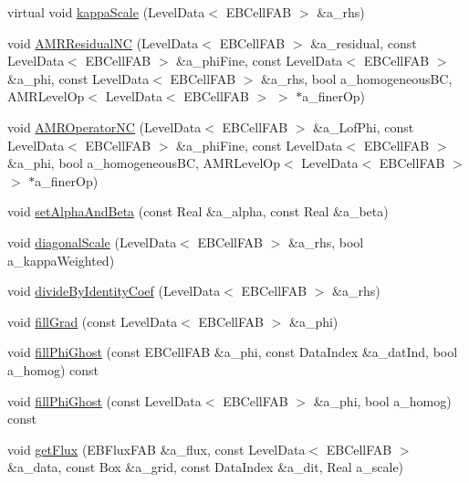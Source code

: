 \begin{DoxyCompactItemize}
virtual void \hyperlink{classnwoebconductivityop_a12a638d8ae31515fadd1510176c2c712}{kappa\+Scale} (Level\+Data$<$ E\+B\+Cell\+F\+AB $>$ \&a\+\_\+rhs)
\item 
void \hyperlink{classnwoebconductivityop_ae8ab6c2d1da51e83415c91d0168a449b}{A\+M\+R\+Residual\+NC} (Level\+Data$<$ E\+B\+Cell\+F\+AB $>$ \&a\+\_\+residual, const Level\+Data$<$ E\+B\+Cell\+F\+AB $>$ \&a\+\_\+phi\+Fine, const Level\+Data$<$ E\+B\+Cell\+F\+AB $>$ \&a\+\_\+phi, const Level\+Data$<$ E\+B\+Cell\+F\+AB $>$ \&a\+\_\+rhs, bool a\+\_\+homogeneous\+BC, A\+M\+R\+Level\+Op$<$ Level\+Data$<$ E\+B\+Cell\+F\+AB $>$ $>$ $\ast$a\+\_\+finer\+Op)
\item 
void \hyperlink{classnwoebconductivityop_a8818e4a4efa8f11847c3a0c6924b13e6}{A\+M\+R\+Operator\+NC} (Level\+Data$<$ E\+B\+Cell\+F\+AB $>$ \&a\+\_\+\+Lof\+Phi, const Level\+Data$<$ E\+B\+Cell\+F\+AB $>$ \&a\+\_\+phi\+Fine, const Level\+Data$<$ E\+B\+Cell\+F\+AB $>$ \&a\+\_\+phi, bool a\+\_\+homogeneous\+BC, A\+M\+R\+Level\+Op$<$ Level\+Data$<$ E\+B\+Cell\+F\+AB $>$ $>$ $\ast$a\+\_\+finer\+Op)
\item 
void \hyperlink{classnwoebconductivityop_a3218fe44c7acd1c1c9ad2d5ec1318650}{set\+Alpha\+And\+Beta} (const Real \&a\+\_\+alpha, const Real \&a\+\_\+beta)
\item 
void \hyperlink{classnwoebconductivityop_af37fe68f1a7b817da55af493dfe40dd7}{diagonal\+Scale} (Level\+Data$<$ E\+B\+Cell\+F\+AB $>$ \&a\+\_\+rhs, bool a\+\_\+kappa\+Weighted)
\item 
void \hyperlink{classnwoebconductivityop_ab3391874a7043da4cdb9603492e7b337}{divide\+By\+Identity\+Coef} (Level\+Data$<$ E\+B\+Cell\+F\+AB $>$ \&a\+\_\+rhs)
\item 
void \hyperlink{classnwoebconductivityop_ad2c89bdecda6fe58f6a1083746ae6f88}{fill\+Grad} (const Level\+Data$<$ E\+B\+Cell\+F\+AB $>$ \&a\+\_\+phi)
\item 
void \hyperlink{classnwoebconductivityop_aa3df19e7c15501ee35feec8df1e26e5b}{fill\+Phi\+Ghost} (const E\+B\+Cell\+F\+AB \&a\+\_\+phi, const Data\+Index \&a\+\_\+dat\+Ind, bool a\+\_\+homog) const 
\item 
void \hyperlink{classnwoebconductivityop_a319646846ab0e1192b55c8fa2fa08a2f}{fill\+Phi\+Ghost} (const Level\+Data$<$ E\+B\+Cell\+F\+AB $>$ \&a\+\_\+phi, bool a\+\_\+homog) const 
\item 
void \hyperlink{classnwoebconductivityop_a3c4e7a340a2c3ecebc82d8d3c791f33e}{get\+Flux} (E\+B\+Flux\+F\+AB \&a\+\_\+flux, const Level\+Data$<$ E\+B\+Cell\+F\+AB $>$ \&a\+\_\+data, const Box \&a\+\_\+grid, const Data\+Index \&a\+\_\+dit, Real a\+\_\+scale)

\end{DoxyCompactItemize}
